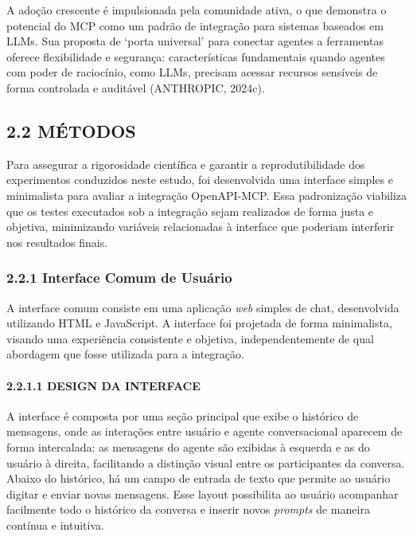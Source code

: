 \documentclass[
]{article}
\begin{document}
A adoção crescente é impulsionada pela comunidade ativa, o que demonstra
o potencial do MCP como um padrão de integração para sistemas baseados
em LLMs. Sua proposta de `porta universal' para conectar agentes a
ferramentas oferece flexibilidade e segurança: características
fundamentais quando agentes com poder de raciocínio, como LLMs, precisam
acessar recursos sensíveis de forma controlada e auditável (ANTHROPIC,
2024c).

\subsection{2.2 MÉTODOS}\label{muxe9todos}

Para assegurar a rigorosidade científica e garantir a reprodutibilidade
dos experimentos conduzidos neste estudo, foi desenvolvida uma interface
simples e minimalista para avaliar a integração OpenAPI-MCP. Essa
padronização viabiliza que os testes executados sob a integração sejam
realizados de forma justa e objetiva, minimizando variáveis relacionadas
à interface que poderiam interferir nos resultados finais.

\subsubsection{2.2.1 Interface Comum de
Usuário}\label{interface-comum-de-usuuxe1rio}

A interface comum consiste em uma aplicação \emph{web} simples de chat,
desenvolvida utilizando HTML e JavaScript. A interface foi projetada de
forma minimalista, visando uma experiência consistente e objetiva,
independentemente de qual abordagem que fosse utilizada para a
integração.

\paragraph{2.2.1.1 DESIGN DA INTERFACE}\label{design-da-interface}

A interface é composta por uma seção principal que exibe o histórico de
mensagens, onde as interações entre usuário e agente conversacional
aparecem de forma intercalada: as mensagens do agente são exibidas à
esquerda e as do usuário à direita, facilitando a distinção visual entre
os participantes da conversa. Abaixo do histórico, há um campo de
entrada de texto que permite ao usuário digitar e enviar novas
mensagens. Esse layout possibilita ao usuário acompanhar facilmente todo
o histórico da conversa e inserir novos \emph{prompts} de maneira
contínua e intuitiva.
\end{document}
